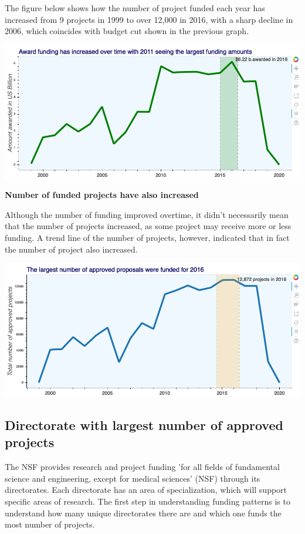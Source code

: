 \documentclass[11pt, oneside]{article}   	%
\begin{document}
The figure below shows how the number of project funded each year has increased from 9 projects in 1999 to over 12,000 in 2016, with a sharp decline in 2006,  which coincides with budget cut shown in the previous graph.

\includegraphics[width=\textwidth]{fundingovertime}

 \textbf{{Number of funded projects have also increased}}
 
Although the number of funding improved overtime, it didn't necessarily mean that the number of projects increased, as some project may receive more or less funding. A trend line of the number of projects, however, indicated that in fact the number of project also increased.

\includegraphics[width=\textwidth]{projectsovertime}

\subsection{Directorate with largest number of approved projects}

The NSF provides research and project funding 'for all fields of fundamental science and engineering, except for medical sciences' (NSF) through its directorates. Each directorate has an area of specialization, which will support specific areas of research. The first step in understanding funding patterns is to understand how many unique directorates there are and which one funds the most number of projects.
 
\end{document}
